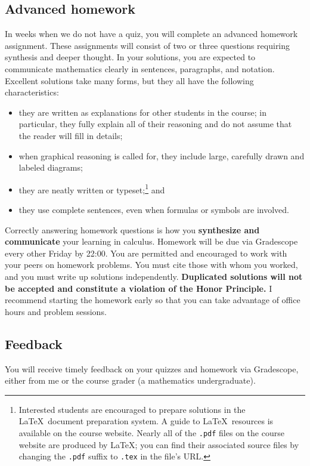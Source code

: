 \documentclass[11pt,twoside]{amsart}
\begin{document}
\subsection*{Advanced homework}\label{hw}
In weeks when we do not have a quiz, you will complete an advanced homework assignment. These assignments will consist of two or three questions requiring synthesis and deeper thought. In your solutions, you are expected to communicate mathematics clearly in sentences, paragraphs, and notation. Excellent solutions take many forms, but they all have the following characteristics:
\begin{itemize}
\item they are written as explanations for other students in the course; in particular, they fully explain all of their reasoning and do not assume that the reader will fill in details;
\item when graphical reasoning is called for, they include large, carefully drawn and labeled diagrams;
\item they are neatly written or typeset;\footnote{Interested students are 
encouraged to prepare solutions in the \LaTeX~document preparation 
system.  A guide to \LaTeX~resources is available on the course 
website.  Nearly all of the \texttt{.pdf} files on the course website are produced by \LaTeX; you can find their associated source files by changing the \texttt{.pdf} suffix to \texttt{.tex} in the file's URL.} and
\item they use complete sentences, even when formulas or symbols are involved.
\end{itemize}

Correctly answering homework questions is how you \textbf{synthesize and communicate} your learning in calculus. Homework will be due via Gradescope every other Friday by 22:00. You are permitted and encouraged to work with your peers on homework problems.  You must cite those with whom you worked, and you must write up solutions independently.  \textbf{Duplicated solutions will not be accepted and constitute a violation of the Honor Principle.} I recommend starting the homework early so that you can take advantage of office hours and problem sessions.

\subsection*{Feedback}
You will receive timely feedback on your quizzes and homework via Gradescope, either from me or the course grader (a mathematics undergraduate).
\end{document}
